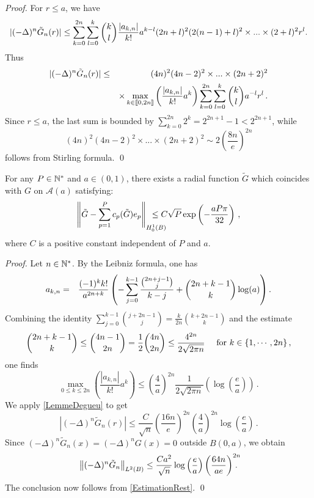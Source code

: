\documentclass[main]{subfiles}
\begin{document}
\begin{proof} For $r \leq a$, we have
	\[|(-\Delta)^n \tilde{G}_n(r)| \leq \sum_{k=0}^{2n}\sum_{l=0}^k \dbinom{k}{l}\dfrac{|a_{k,n}|}{k!}a^{k-l}(2n+l)^2(2(n-1)+l)^2\times ... \times (2+l)^2r^{l}.\]	
	Thus 
	\begin{eqnarray*}		
		|(-\Delta)^n \tilde{G}_n(r)| &\leq& (4n)^2(4n-2)^2 \times ... \times (2n+2)^2\\
		&&\times\max_{k\in\llbracket 0,2n\rrbracket}\left(\dfrac{|a_{k,n}|}{k!}a^k\right)\sum_{k=0}^{2n}\sum_{l=0}^k \dbinom{k}{l}a^{-l}r^l\,.	
	\end{eqnarray*}
	Since $r\leq a$, the last sum is bounded by $\displaystyle\sum_{k=0}^{2n}2^k = 2^{2n+1}-1 < 2^{2n+1}$,
	while 
	\[(4n)^2(4n-2)^2\times...\times (2n+2)^2 \sim 2\left(\dfrac{8n}{e}\right)^{2n}\]
	follows from Stirling formula. 
	\qed
\end{proof}
\begin{lemma}
	\label{The:DecroissanceErreurProlongementPoly}
	For any $P \in \mathbb{N}^*$ and $a \in (0,1)$, there exists a radial function $\tilde{G}$ which coincides with $G$ on $\mathcal{A}(a)$ satisfying:
	\[\norm{\tilde{G} - \sum_{p=1}^{P}c_p(\tilde{G})e_p}_{H^1_0(B)} \hspace{-0.7cm}\leq C \sqrt{P} \exp\left(-\frac{aP\pi}{32}\right)\,,\]
	where $C$ is a positive constant independent of $P$ and $a$. 
\end{lemma}
\begin{proof}
	Let $n \in \mathbb{N}^*$. By the Leibniz formula, one has
	\begin{eqnarray*}						
		a_{k,n} & = & \dfrac{(-1)^k k!}{a^{2n+k}}  \left(-\displaystyle\sum_{j=0}^{k-1}\dfrac{\binom{2n+j-1}{j}}{k-j}+\dbinom{2n+k-1}{k}\log(a)\right). \\
	\end{eqnarray*}
	Combining the identity $\sum_{j=0}^{k-1}\binom{j+2n-1}{j} = \frac{k}{2n}\binom{k+2n-1}{k}$
	and the estimate
	\begin{equation*}
	\dbinom{2n+k-1}{k}\leq \dbinom{4n-1}{2n} = \frac{1}{2}\dbinom{4n}{2n} \leq \dfrac{4^{2n}}{2\sqrt{2\pi n}} \quad \text{ for } k \in \{1,\cdots,2n\}\,,
	\end{equation*}
	one finds
	\begin{equation}
	\max_{0\leq k \leq 2n}\left(\dfrac{|a_{k,n}|}{k!}a^k\right) \leq \left(\frac{4}{a}\right)^{2n}\dfrac{1}{2\sqrt{2\pi n}}\left(\log\left(\frac{e}{a}\right)\right)\,.
	\label{majorAkLog} 
	\end{equation}							
	We apply \autoref{LemmeDegueu} to get
	\[|(-\Delta)^n \tilde{G}_n (r)|\leq \dfrac{C}{\sqrt{n}}\left( \frac{16n}{e}\right)^{2n}\left(\frac{4}{a}\right)^{2n}\log\left(\dfrac{e}{a}\right)\,.\]
	Since $(-\Delta)^n \tilde{G}_n(x) = (-\Delta)^n G(x) = 0$ outside $B(0,a)$, we obtain
	\[ \left\|(-\Delta)^n \tilde{G}_n\right\|_{L^2(B)} \leq \dfrac{C a^2}{\sqrt{n}}\log\left(\frac{e}{a}\right)\left( \frac{64n}{ae}\right)^{2n}\!\!\!\!\!\!\,.\]
	The conclusion now follows from \autoref{EstimationRest}. 
	\qed
\end{proof}
\end{document}
